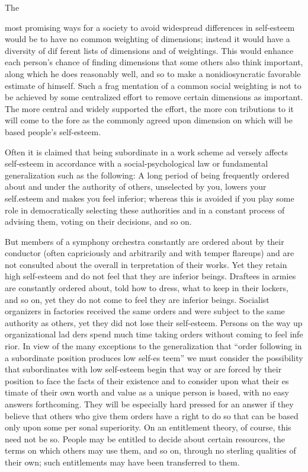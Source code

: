 \documentclass[11pt,openany]{book}
\begin{document}
The 

most promising ways for a society to avoid widespread differences in self-esteem would be to have no common weighting of dimensions; instead it would have a diversity of dif ferent lists of dimensions and of weightings. This would enhance each person's chance of finding dimensions that some others also think important, along which he does reasonably well, and so to make a nonidiosyncratic favorable estimate of himself. Such a frag mentation of a common social weighting is not to be achieved by some centralized effort to remove certain dimensions as important. The more central and widely supported the effort, the more con tributions to it will come to the fore as the commonly agreed upon dimension on which will be based people's self-esteem. 

Often it is claimed that being subordinate in a work scheme ad versely affects self-esteem in accordance with a social-psychological law or fundamental generalization such as the following: A long period of being frequently ordered about and under the authority of others, unselected by you, lowers your self.esteem and makes you feel inferior; whereas this is avoided if you play some role in democratically selecting these authorities and in a constant process of advising them, voting on their decisions, and so on. 

But members of a symphony orchestra constantly are ordered about by their conductor (often capriciously and arbitrarily and with temper flareups) and are not consulted about the overall in terpretation of their works. Yet they retain high self-esteem and do not feel that they are inferior beings. Draftees in armies are constantly ordered about, told how to dress, what to keep in their lockers, and so on, yet they do not come to feel they are inferior beings. Socialist organizers in factories received the same orders and were subject to the same authority as others, yet they did not lose their self-esteem. Persons on the way up organizational lad ders spend much time taking orders without coming to feel infe rior. In view of the many exceptions to the generalization that ``order following in a subordinate position produces low self-es teem'' we must consider the possibility that subordinates with low self-esteem begin that way or are forced by their position to face the facts of their existence and to consider upon what their es timate of their own worth and value as a unique person is based, with no easy answers forthcoming. They will be especially hard pressed for an answer if they believe that others who give them orders have a right to do so that can be based only upon some per sonal superiority. On an entitlement theory, of course, this need not be so. People may be entitled to decide about certain resources, the terms on which others may use them, and so on, through no sterling qualities of their own; such entitlements may have been transferred to them. 
\end{document}

